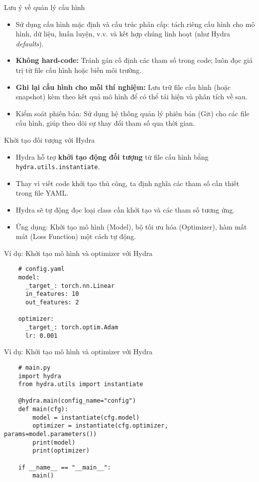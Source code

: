 \documentclass{beamer}
\begin{document}
\begin{frame}{Lưu ý về quản lý cấu hình}
    \begin{itemize}
        \item Sử dụng cấu hình mặc định và cấu trúc phân cấp: tách riêng cấu hình cho mô hình, dữ liệu, huấn luyện, v.v. và kết hợp chúng linh hoạt (như Hydra \textit{defaults}).
        \item \textbf{Không hard-code:} Tránh gán cố định các tham số trong code; luôn đọc giá trị từ file cấu hình hoặc biến môi trường.
        \item \textbf{Ghi lại cấu hình cho mỗi thí nghiệm:} Lưu trữ file cấu hình (hoặc snapshot) kèm theo kết quả mô hình để có thể tái hiện và phân tích về sau.
        \item Kiểm soát phiên bản: Sử dụng hệ thống quản lý phiên bản (Git) cho các file cấu hình, giúp theo dõi sự thay đổi tham số qua thời gian.
    \end{itemize}
\end{frame}

\begin{frame}{Khởi tạo đối tượng với Hydra}
    \begin{itemize}
        \item Hydra hỗ trợ \textbf{khởi tạo động đối tượng} từ file cấu hình bằng \texttt{hydra.utils.instantiate}.
        \item Thay vì viết code khởi tạo thủ công, ta định nghĩa các tham số cần thiết trong file YAML.
        \item Hydra sẽ tự động đọc loại class cần khởi tạo và các tham số tương ứng.
        \item Ứng dụng: Khởi tạo mô hình (Model), bộ tối ưu hóa (Optimizer), hàm mất mát (Loss Function) một cách tự động.
    \end{itemize}
\end{frame}

\begin{frame}[fragile]{Ví dụ: Khởi tạo mô hình và optimizer với Hydra}
    \begin{verbatim}
    # config.yaml
    model:
      _target_: torch.nn.Linear
      in_features: 10
      out_features: 2
    
    optimizer:
      _target_: torch.optim.Adam
      lr: 0.001
    \end{verbatim}
\end{frame}

\begin{frame}[fragile]{Ví dụ: Khởi tạo mô hình và optimizer với Hydra}
    \begin{verbatim}
    # main.py
    import hydra
    from hydra.utils import instantiate
    
    @hydra.main(config_name="config")
    def main(cfg):
        model = instantiate(cfg.model)
        optimizer = instantiate(cfg.optimizer, params=model.parameters())
        print(model)
        print(optimizer)
    
    if __name__ == "__main__":
        main()
    \end{verbatim}
\end{frame}
\end{document}
